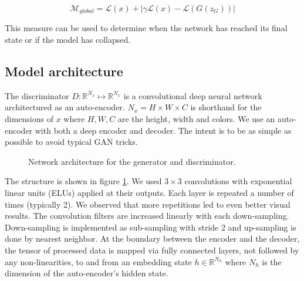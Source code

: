 \documentclass[english]{article}
\begin{document}
\[
\mathcal{M}{}_{global}=\mathcal{L}(x)+|\gamma\mathcal{L}(x)-\mathcal{L}(G(z_{G}))|
\]


This measure can be used to determine when the network has reached
its final state or if the model has collapsed.


\subsection{Model architecture}

The discriminator $D:\mathbb{R}^{N_{x}}\mapsto\mathbb{R}^{N_{x}}$
is a convolutional deep neural network architectured as an auto-encoder.
$N_{x}=H\times W\times C$ is shorthand for the dimensions of $x$
where $H,W,C$ are the height, width and colors. We use an auto-encoder
with both a deep encoder and decoder. The intent is to be as simple
as possible to avoid typical GAN tricks. 

\begin{figure}


\caption{Network architecture for the generator and discriminator.\label{fig:Network}}


\end{figure}


The structure is shown in figure \ref{fig:Network}. We used $3\times3$
convolutions with exponential linear units \cite{clevert2015fast_elu}
(ELUs) applied at their outputs. Each layer is repeated a number of
times (typically 2). We observed that more repetitions led to even
better visual results. The convolution filters are increased linearly
with each down-sampling. Down-sampling is implemented as sub-sampling
with stride 2 and up-sampling is done by nearest neighbor. At the
boundary between the encoder and the decoder, the tensor of processed
data is mapped via fully connected layers, not followed by any non-linearities,
to and from an embedding state $h\in\mathbb{R}^{N_{h}}$ where $N_{h}$
is the dimension of the auto-encoder's hidden state. 
\end{document}
